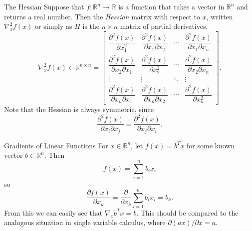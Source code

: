 \documentclass[aspectratio=169,12pt]{beamer}
\begin{document}
\begin{frame}[t]{The Hessian}
  \vspace{-0.15cm}
  {\scriptsize
  Suppose that $f:\mathbb{R}^{n}\to\mathbb{R}$ is a function that takes a vector
  in $\mathbb{R}^{n}$ and returns a real number. Then the \emph{Hessian} matrix
  with respect to $x$, written $\nabla_x^2f(x)$ or simply as $H$ is the
  $n\times n$ matrix of partial derivatives,
  \[
    \nabla_x^2f(x)\in\mathbb{R}^{n\times n}
    =\begin{bmatrix}
      \dfrac{\partial^2f(x)}{\partial x_1^2}&
      \dfrac{\partial^2f(x)}{\partial x_1\partial x_2}&\cdots&
      \dfrac{\partial^2f(x)}{\partial x_1\partial x_n}\\[0.45em]
      \dfrac{\partial^2f(x)}{\partial x_2\partial x_1}&
      \dfrac{\partial^2f(x)}{\partial x_2^2}&\cdots&
      \dfrac{\partial^2f(x)}{\partial x_2\partial x_n}\\
      \vdots&\vdots&\ddots&\vdots\\[0.20em]
      \dfrac{\partial^2f(x)}{\partial x_n\partial x_1}&
      \dfrac{\partial^2f(x)}{\partial x_n\partial x_2}&\cdots&
      \dfrac{\partial^2f(x)}{\partial x_n^2}
    \end{bmatrix}.
  \]
  Note that the Hessian is always symmetric, since
  \[
    \frac{\partial^2f(x)}{\partial x_i\partial x_j}
    =\frac{\partial^2f(x)}{\partial x_j\partial x_i}.
  \]
  }
\end{frame}

\begin{frame}[t]{Gradients of Linear Functions}
  \vspace{0.36cm}
  {\small
  For $x\in\mathbb{R}^{n}$, let $f(x)=b^Tx$ for some known vector
  $b\in\mathbb{R}^{n}$. Then
  \[
    f(x)=\sum_{i=1}^{n}b_i x_i
  \]
  so
  \[
    \frac{\partial f(x)}{\partial x_k}
    =\frac{\partial}{\partial x_k}\sum_{i=1}^{n}b_i x_i=b_k.
  \]
  From this we can easily see that $\nabla_x b^Tx=b$. This should be compared to
  the analogous situation in single variable calculus, where
  $\partial(ax)/\partial x=a$.
  }
\end{frame}
\end{document}
